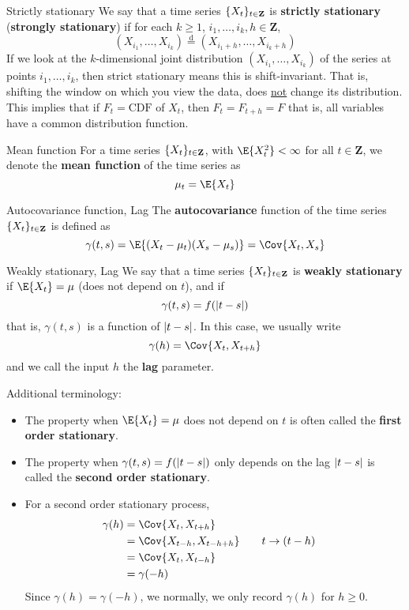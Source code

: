 \begin{Definition}{Strictly stationary}{}
    We say that a time series $ \{X_t\}_{t\in\mathbf{Z}} $
    is \textbf{strictly stationary} (\textbf{strongly stationary})
    if for each $ k\ge 1 $, $ i_1,\ldots,i_k,h\in\mathbf{Z} $,
    \[ (X_{i_1},\ldots,X_{i_k})\stackrel{\text{d}}{=}
        (X_{i_{1}+h},\ldots,X_{i_k+h}) \]
    {\color{blue}If we look at the $ k $-dimensional joint distribution
    $ (X_{i_1},\ldots,X_{i_k}) $
    of the series at points $ i_1,\ldots,i_k $, then
    strict stationary means this is shift-invariant.}
    That is, shifting the window on which
    you view the data, does \underline{not} change its distribution.
    This implies that if $ F_t=\text{CDF} $ of $ X_t $, then
    $ F_t=F_{t+h}=F $
    that is, all variables have a common distribution function.
\end{Definition}
\begin{Definition}{Mean function}{}
    For a time series $ \{X_t\}_{t\in\mathbf{Z}} $, with
    $ \E{X_t^2}<\infty $ for all $ t\in\mathbf{Z} $,
    we denote the \textbf{mean function} of the time series as
    \[ \mu_t=\E{X_t} \]
\end{Definition}
\begin{Definition}{Autocovariance function, Lag}{}
    The \textbf{autocovariance} function of the time series $ \{X_t\}_{t\in\mathbf{Z}} $
    is defined as
    \[ \gamma(t,s)=\E{(X_t-\mu_t)(X_s-\mu_s)}=\Cov{X_t,X_s} \]
\end{Definition}
\begin{Definition}{Weakly stationary, Lag}{}
    We say that a time series $ \{X_t\}_{t\in\mathbf{Z}} $
    is \textbf{weakly stationary} if $ \E{X_t}=\mu $
    (does not depend on $ t $), and if
    \[ \gamma(t,s)=f(\lvert t-s\rvert) \]
    that is, $ \gamma(t,s) $ is a function of $ \lvert t-s\rvert $. In this case,
    we usually write
    \[ \gamma(h)=\Cov{X_t,X_{t+h}} \]
    and we call the input $ h $ the \textbf{lag} parameter.
\end{Definition}
Additional terminology:
\begin{itemize}
    \item The property when $ \E{X_t}=\mu $ does not depend
          on $ t $ is often called the \textbf{first order stationary}.
    \item The property when $ \gamma(t,s)=f(\lvert t-s\rvert) $
          only depends on the lag $ \lvert t-s\rvert $ is called the
          \textbf{second order stationary}.
    \item For a second order stationary process,
          \begin{align*}
              \gamma(h)
               & =\Cov{X_t,X_{t+h}}                                      \\
               & =\Cov{X_{t-h},X_{t-h+h}} & \quad & t\rightarrow{} (t-h) \\
               & =\Cov{X_t,X_{t-h}}                                      \\
               & =\gamma(-h)
          \end{align*}
          Since $ \gamma(h)=\gamma(-h) $, we
          normally, we only record $ \gamma(h) $ for $ h\ge 0 $.
\end{itemize}
